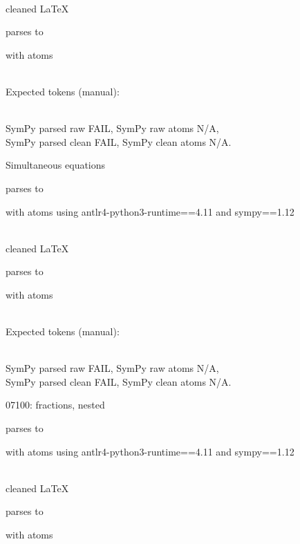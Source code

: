 \documentclass{article}
\begin{document}
\ \\
cleaned \LaTeX

parses to

with atoms


\ \\
Expected tokens (manual):


\ \\
SymPy parsed raw FAIL, 
SymPy raw atoms N/A, \\
SymPy parsed clean FAIL, 
SymPy clean atoms N/A.

\hrulefill

Simultaneous equations

parses to

with atoms
using antlr4-python3-runtime==4.11 and sympy==1.12

\ \\
cleaned \LaTeX

parses to

with atoms


\ \\
Expected tokens (manual):


\ \\
SymPy parsed raw FAIL, 
SymPy raw atoms N/A, \\
SymPy parsed clean FAIL, 
SymPy clean atoms N/A.

\hrulefill

07100:
fractions, nested

parses to

with atoms
using antlr4-python3-runtime==4.11 and sympy==1.12

\ \\
cleaned \LaTeX

parses to

with atoms

\end{document}
